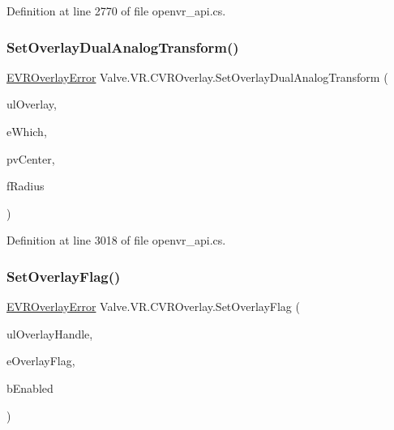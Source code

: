 Definition at line 2770 of file openvr\+\_\+api.\+cs.

\mbox{\label{class_valve_1_1_v_r_1_1_c_v_r_overlay_a3aa8a237a6a51682f894fb7d79f4949f}} 
\subsubsection{\texorpdfstring{SetOverlayDualAnalogTransform()}{SetOverlayDualAnalogTransform()}}
{\footnotesize\ttfamily \mbox{\hyperlink{namespace_valve_1_1_v_r_aaee5c5144f42b7969d45b854f51b0c18}{E\+V\+R\+Overlay\+Error}} Valve.\+V\+R.\+C\+V\+R\+Overlay.\+Set\+Overlay\+Dual\+Analog\+Transform (\begin{DoxyParamCaption}\item[{ulong}]{ul\+Overlay,  }\item[{\mbox{\hyperlink{namespace_valve_1_1_v_r_a3a5fe210bea8b993a1ad42f680119e90}{E\+Dual\+Analog\+Which}}}]{e\+Which,  }\item[{ref \mbox{\hyperlink{struct_valve_1_1_v_r_1_1_hmd_vector2__t}{Hmd\+Vector2\+\_\+t}}}]{pv\+Center,  }\item[{float}]{f\+Radius }\end{DoxyParamCaption})}



Definition at line 3018 of file openvr\+\_\+api.\+cs.

\mbox{\label{class_valve_1_1_v_r_1_1_c_v_r_overlay_a5e79960d92824eb6bf45bc0ca27c00b4}} 
\subsubsection{\texorpdfstring{SetOverlayFlag()}{SetOverlayFlag()}}
{\footnotesize\ttfamily \mbox{\hyperlink{namespace_valve_1_1_v_r_aaee5c5144f42b7969d45b854f51b0c18}{E\+V\+R\+Overlay\+Error}} Valve.\+V\+R.\+C\+V\+R\+Overlay.\+Set\+Overlay\+Flag (\begin{DoxyParamCaption}\item[{ulong}]{ul\+Overlay\+Handle,  }\item[{\mbox{\hyperlink{namespace_valve_1_1_v_r_a34c8e00ad63b95c5f533b1387bcab6ff}{V\+R\+Overlay\+Flags}}}]{e\+Overlay\+Flag,  }\item[{bool}]{b\+Enabled }\end{DoxyParamCaption})}



